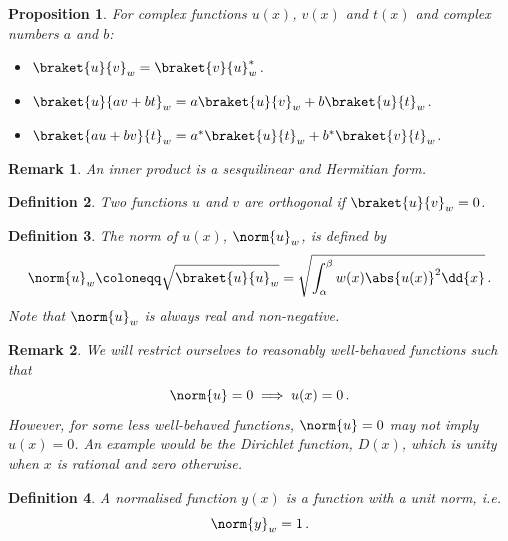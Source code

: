 \documentclass{article}
\theoremstyle{plain}\theoremheaderfont{\normalfont\itshape}\theorembodyfont{\rmfamily}\theoremseparator{.}\newtheorem*{rem}{Remark}\newtheorem*{ex}{Example}\newtheorem*{proof}{Proof}\newtheorem*{altp}{Alternative proof}
\theoremstyle{plain}\theoremheaderfont{\normalfont\bfseries}\theorembodyfont{\rmfamily}\theoremseparator{.}\newtheorem{thm}{Theorem}[section]\newtheorem{lem}[thm]{Lemma}\newtheorem{prop}[thm]{Proposition}\newtheorem*{cor}{Corollary}\newtheorem{defn}[thm]{Definition}\newtheorem{clm}[thm]{Claim}\newtheorem{clminproof}{Claim}
\theoremstyle{break}\theoremheaderfont{\normalfont\itshape}\theorembodyfont{\rmfamily}\theoremseparator{.\medskip}\newtheorem*{proofskip}{Proof}\newtheorem*{exs}{Examples}\newtheorem*{rems}{Remarks}
\theoremstyle{break}\theoremheaderfont{\normalfont\bfseries}\theorembodyfont{\rmfamily}\theoremseparator{.\medskip}\newtheorem{lemskip}[thm]{Lemma}\newtheorem{defnskip}[thm]{Definition}\newtheorem{propskip}[thm]{Proposition}\newtheorem{thmskip}[thm]{Theorem}
\numberwithin{equation}{section}
\begin{document}
	\begin{prop}
		For complex functions \(u(x)\), \(v(x)\) and \(t(x)\) and complex numbers \(a\) and \(b\):
		\begin{itemize}[topsep=0pt,parsep=1em]
			\item \(\braket{u}{v}_w=\braket{v}{u}_w^*\).
			\item \(\braket{u}{av+bt}_w=a\braket{u}{v}_w+b\braket{u}{t}_w\).
			\item \(\braket{au+bv}{t}_w=a^*\braket{u}{t}_w+b^*\braket{v}{t}_w\).
		\end{itemize}
	\end{prop}
	\begin{rem}
		An inner product is a sesquilinear and Hermitian form.
	\end{rem}
	\begin{defn}
		Two functions \(u\) and \(v\) are \textit{orthogonal} if \(\braket{u}{v}_w=0\).
	\end{defn}
	\begin{defn}
		The \textit{norm} of \(u(x)\), \(\norm{u}_w\), is defined by
		\[\norm{u}_w\coloneqq\sqrt{\braket{u}{u}_w}=\sqrt{\int_{\alpha}^{\beta}w(x)\abs{u(x)}^2\dd{x}}\,.\]
		Note that \(\norm{u}_w\) is always real and non-negative.
	\end{defn}
	\begin{rem}
		We will restrict ourselves to reasonably well-behaved functions such that
		\[\norm{u}=0\implies u(x)=0\,.\]
		However, for some less well-behaved functions, \(\norm{u}=0\) may not imply \(u(x)=0\). An example would be the \textit{Dirichlet function}, \(D(x)\), which is unity when \(x\) is rational and zero otherwise.
	\end{rem}
	\begin{defn}
		A \textit{normalised function} \(y(x)\) is a function with a unit norm, i.e.
		\[\norm{y}_w=1\,.\]
	\end{defn}
\end{document}
